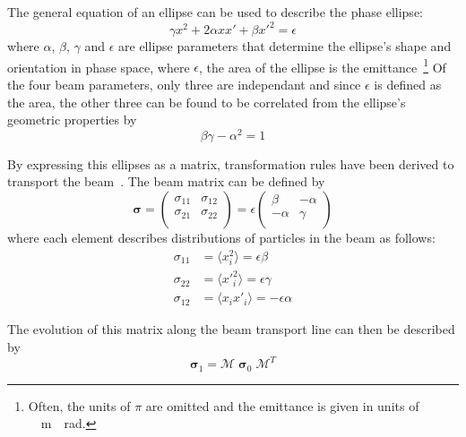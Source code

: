 
The general equation of an ellipse can be used to describe the phase ellipse:
\begin{equation}
	\gamma x^2 + 2\alpha xx' + \beta x'^2 = \epsilon
\end{equation}
where \(\alpha\),  \(\beta\), \(\gamma\) and \(\epsilon\) are ellipse parameters
that determine the ellipse's shape and orientation in phase space, where
\(\epsilon\), the area of the ellipse is the emittance~\footnote{Often, the
units of \(\pi\) are omitted and the emittance is given in units of
\si{\pi\;\meter\;\radian}.} Of the four beam parameters, only three are
independant and since \(\epsilon\) is defined as the area, the other three can
be found to be correlated from the ellipse's geometric properties by
\begin{equation}
	\beta\gamma - \alpha^2 = 1
\end{equation}



By expressing this ellipses as a matrix, transformation rules have been derived
to transport the beam~\cite{wiedemann2007particle}. The beam matrix can be
defined by
\begin{equation}
	\bm{\sigma} =
	\begin{pmatrix}
		\sigma_{11} & \sigma_{12} \\
		\sigma_{21} & \sigma_{22} \\
	\end{pmatrix}
	=
	\epsilon
	\begin{pmatrix}
		\beta & -\alpha \\
		-\alpha & \gamma \\
	\end{pmatrix}
\end{equation}
where each element describes distributions of particles in the beam as follows:
\begin{align}
	\sigma_{11} &= \langle x_i^2 \rangle = \epsilon\beta \\
	\sigma_{22} &= \langle {x'}_i^2 \rangle = \epsilon\gamma \\
	\sigma_{12} &= \langle x_i x'_i \rangle = -\epsilon\alpha
\end{align}

The evolution of this matrix along the beam transport line can then be described
by
\begin{equation}
	\bm{\sigma}_1 = \mathcal{M}\;\bm{\sigma}_0\;\mathcal{M}^T
	\label{eq:apply}
\end{equation}

